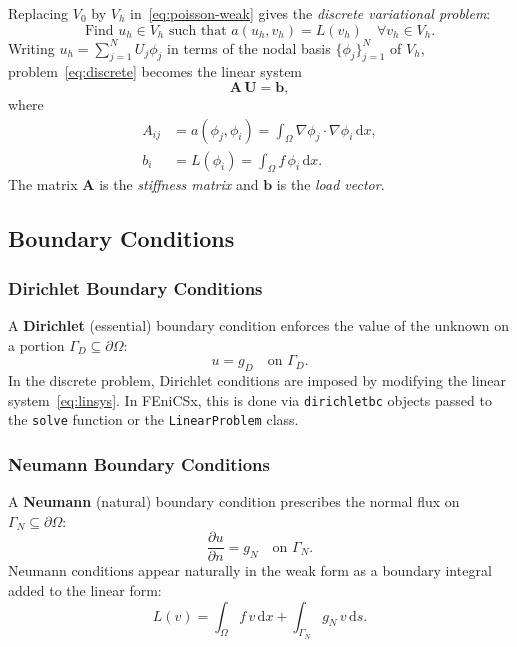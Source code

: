 \documentclass[11pt]{article}
\newcommand{\dx}{\,\mathrm{d}x}
\newcommand{\ds}{\,\mathrm{d}s}
\newcommand{\Grad}{\nabla}
\newcommand{\domain}{\Omega}
\newcommand{\boundary}{\partial\Omega}
\begin{document}
Replacing $V_0$ by $V_h$ in~\eqref{eq:poisson-weak} gives the
\emph{discrete variational problem}:
\begin{equation}
  \label{eq:discrete}
  \text{Find } u_h \in V_h \text{ such that }
  a(u_h, v_h) = L(v_h) \quad \forall v_h \in V_h.
\end{equation}
Writing $u_h = \sum_{j=1}^N U_j \phi_j$ in terms of the nodal basis
$\{\phi_j\}_{j=1}^N$ of $V_h$, problem~\eqref{eq:discrete} becomes the
linear system
\begin{equation}
  \label{eq:linsys}
  \mathbf{A}\,\mathbf{U} = \mathbf{b},
\end{equation}
where
\begin{align*}
  A_{ij} &= a(\phi_j, \phi_i) = \int_\domain \Grad\phi_j \cdot \Grad\phi_i \dx, \\
  b_i    &= L(\phi_i)        = \int_\domain f\,\phi_i \dx.
\end{align*}
The matrix $\mathbf{A}$ is the \emph{stiffness matrix} and $\mathbf{b}$ is
the \emph{load vector}.

\subsection{Boundary Conditions}

\subsubsection{Dirichlet Boundary Conditions}

A \textbf{Dirichlet} (essential) boundary condition enforces the value of
the unknown on a portion $\Gamma_D \subseteq \boundary$:
\begin{equation*}
  u = g_D \quad \text{on } \Gamma_D.
\end{equation*}
In the discrete problem, Dirichlet conditions are imposed by modifying the
linear system~\eqref{eq:linsys}.
In FEniCSx, this is done via \texttt{dirichletbc} objects passed to the
\texttt{solve} function or the \texttt{LinearProblem} class.

\subsubsection{Neumann Boundary Conditions}

A \textbf{Neumann} (natural) boundary condition prescribes the normal flux
on $\Gamma_N \subseteq \boundary$:
\begin{equation*}
  \frac{\partial u}{\partial n} = g_N \quad \text{on } \Gamma_N.
\end{equation*}
Neumann conditions appear naturally in the weak form as a boundary integral
added to the linear form:
\begin{equation*}
  L(v) = \int_\domain f\,v \dx + \int_{\Gamma_N} g_N\,v \ds.
\end{equation*}
\end{document}
